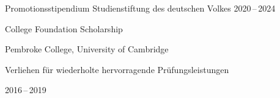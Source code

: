 %
\begin{cvhonors}%
  \cvhonor%
    {Promotionsstipendium} %
    {Studienstiftung des deutschen Volkes} %
    {} %
    {2020\,--\,2024} %
\end{cvhonors}%
\begin{cvhonors}%
  \cvhonor%
    {College Foundation Scholarship} %
    {%
      Pembroke College, University of Cambridge\newline~
      \begin{cvitems}
        \item {Verliehen f\"ur wiederholte hervorragende Pr\"ufungsleistungen}
      \end{cvitems}
    } %
    {} %
    {2016\,--\,2019} %
\end{cvhonors}
